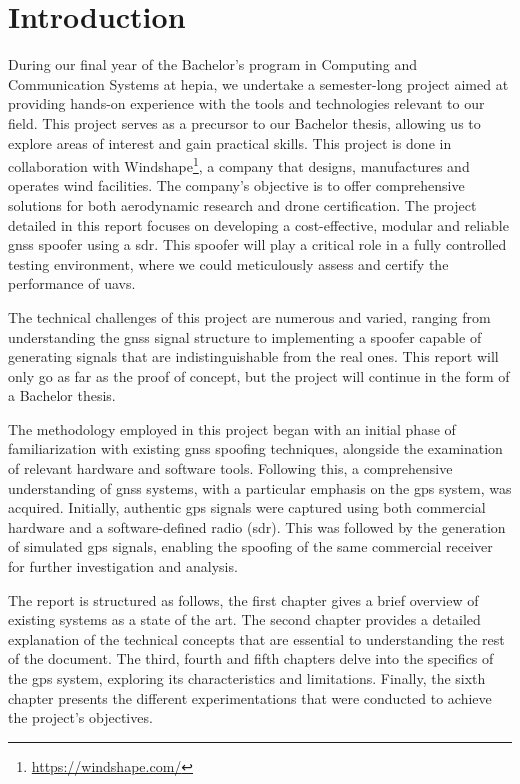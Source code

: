 \chapter*{Introduction}

During our final year of the Bachelor's program in Computing and Communication Systems at \gls{hepia}, we undertake a semester-long project aimed at providing hands-on experience with the tools and technologies relevant to our field. This project serves as a precursor to our Bachelor thesis, allowing us to explore areas of interest and gain practical skills. This project is done in collaboration with Windshape\footnote{\url{https://windshape.com/}}, a company that designs, manufactures and operates wind facilities. The company's objective is to offer comprehensive solutions for both aerodynamic research and drone certification. The project detailed in this report focuses on developing a cost-effective, modular and reliable \gls{gnss} spoofer using a \gls{sdr}. This spoofer will play a critical role in a fully controlled testing environment, where we could meticulously assess and certify the performance of \gls{uav}s.

The technical challenges of this project are numerous and varied, ranging from understanding the \gls{gnss} signal structure to implementing a spoofer capable of generating signals that are indistinguishable from the real ones. This report will only go as far as the proof of concept, but the project will continue in the form of a Bachelor thesis.

The methodology employed in this project began with an initial phase of familiarization with existing \gls{gnss} spoofing techniques, alongside the examination of relevant hardware and software tools. Following this, a comprehensive understanding of \gls{gnss} systems, with a particular emphasis on the \gls{gps} system, was acquired. Initially, authentic \gls{gps} signals were captured using both commercial hardware and a software-defined radio (\gls{sdr}). This was followed by the generation of simulated \gls{gps} signals, enabling the spoofing of the same commercial receiver for further investigation and analysis.

The report is structured as follows, the first chapter gives a brief overview of existing systems as a state of the art. The second chapter provides a detailed explanation of the technical concepts that are essential to understanding the rest of the document. The third, fourth and fifth chapters delve into the specifics of the \gls{gps} system, exploring its characteristics and limitations. Finally, the sixth chapter presents the different experimentations that were conducted to achieve the project's objectives.